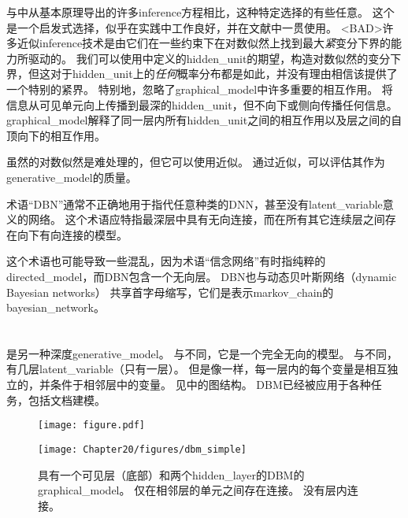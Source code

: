 与中从基本原理导出的许多\gls{inference}方程相比，这种特定选择的有些任意。
这个是一个启发式选择，似乎在实践中工作良好，并在文献中一贯使用。
<BAD>许多近似\gls{inference}技术是由它们在一些约束下在对数似然上找到最大\emph{紧}变分下界的能力所驱动的。
我们可以使用中定义的\gls{hidden_unit}的期望，构造对数似然的变分下界，但这对于\gls{hidden_unit}上的\emph{任何}概率分布都是如此，并没有理由相信该提供了一个特别的紧界。
特别地，忽略了\gls{graphical_model}中许多重要的相互作用。
将信息从可见单元向上传播到最深的\gls{hidden_unit}，但不向下或侧向传播任何信息。
\gls{graphical_model}解释了同一层内所有\gls{hidden_unit}之间的相互作用以及层之间的自顶向下的相互作用。


虽然的对数似然是难处理的，但它可以使用近似\citep{Salakhutdinov+Murray-2008}。
通过近似，可以评估其作为\gls{generative_model}的质量。


术语``\gls{DBN}''通常不正确地用于指代任意种类的\gls{DNN}，甚至没有\gls{latent_variable}意义的网络。
这个术语应特指最深层中具有无向连接，而在所有其它连续层之间存在向下有向连接的模型。

这个术语也可能导致一些混乱，因为术语``信念网络''有时指纯粹的\gls{directed_model}，而\gls{DBN}包含一个无向层。
\gls{DBN}也与动态贝叶斯网络（dynamic Bayesian networks） \citep{Dean+Kanazawa-1989}共享首字母缩写，它们是表示\gls{markov_chain}的\gls{bayesian_network}。


\section{}
\label{sec:deep_boltzmann_machines}

 \citep{SalHinton09}是另一种深度\gls{generative_model}。
与不同，它是一个完全无向的模型。
与不同，有几层\gls{latent_variable}（只有一层）。
但是像一样，每一层内的每个变量是相互独立的，并条件于相邻层中的变量。
见中的图结构。
\gls{DBM}已经被应用于各种任务，包括文档建模\citep{srivastava2013modeling}。

\begin{figure}[!htb]
\ifOpenSource
\centerline{\texttt{[image: figure.pdf]}}
\else
\centerline{\texttt{[image: Chapter20/figures/dbm\_simple]}}
\fi
\caption{具有一个可见层（底部）和两个\gls{hidden_layer}的\gls{DBM}的\gls{graphical_model}。
仅在相邻层的单元之间存在连接。
没有层内连接。}
\label{fig:chap20_dbm_simple}
\end{figure}

